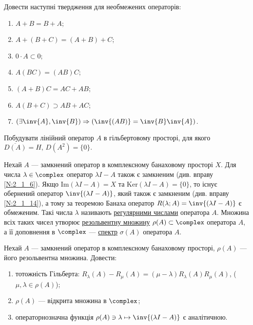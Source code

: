 
\begin{exercise}
    Довести наступні твердження для необмежених операторів:
    \begin{enumerate}
        \item $A + B = B + A$;
        \item $A + (B + C) = (A + B) + C$;
        \item $0 \cdot A \subset 0$;
        \item $A(BC) = (AB)C$;
        \item $(A+B)C = AC + AB$;
        \item $A(B+C) \supset AB + AC$;
        \item $\left( \exists \inv{A}, \inv{B} \right)  \Rightarrow 
               \left( \inv{(AB)} = \inv{B}\inv{A} \right)$.
    \end{enumerate}
\end{exercise}

\begin{exercise}
    Побудувати лінійний оператор $A$ в гільбертовому просторі, для якого $\overline{D(A)} = H$,
    $D(A^2) = \{0\}$.
\end{exercise}

\begin{theory}
    Нехай $A$ --- замкнений оператор в комплексному банаховому просторі $X$.
    Для числа $\lambda \in \complex$ оператор $\lambda I - A$ також є замкненим
    (див. вправу \ref{N:2_1_6}). Якщо $\mathrm{Im}(\lambda I - A) = X$ та 
    $\mathrm{Ker}(\lambda I - A) = \{0\}$, то існує обернений оператор $\inv{(\lambda I - A)}$,
    який також є замкненим (див. вправу \ref{N:2_1_14}), а тому за теоремою Банаха оператор
    $R(\lambda; A) = \inv{(\lambda I - A)}$ є обмеженим. Такі числа $\lambda$ називають
    \ul{регулярними числами} оператора $A$. Множина всіх таких чисел утворює 
    \ul{резольвентну множину} $\rho(A) \subset \complex$ оператора $A$, а її доповнення
    в $\complex$ --- \ul{спектр} $\sigma(A)$ оператора $A$.
\end{theory}

\begin{exercise}
    Нехай $A$ --- замкнений оператор в комплексному банаховому просторі, $\rho(A)$ --- його
    резольвентна множина. Довести:
    \begin{enumerate}
        \item тотожність Гільберта: $R_\lambda(A) - R_\mu(A) = (\mu - \lambda) R_\lambda(A)R_\mu(A)$,
        ($\mu, \lambda \in \rho(A)$);
        \item $\rho(A)$ --- відкрита множина в $\complex$;
        \item операторнозначна функція $\rho(A) \ni \lambda \mapsto \inv{(\lambda I - A)}$ є аналітичною.
    \end{enumerate}
\end{exercise}

